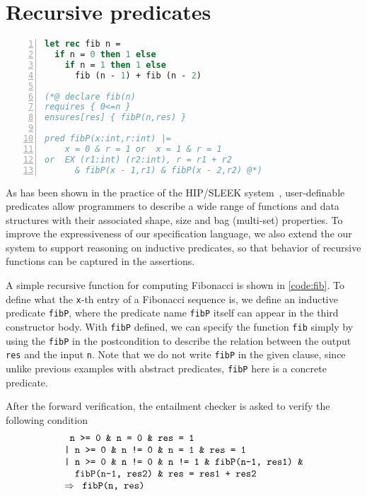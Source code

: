 \section{Recursive predicates}

\begin{lstlisting}[language=Caml, mathescape=true, xleftmargin=2em, aboveskip=1em, xrightmargin=1em, numbers=left, frame = {TB}, caption=Use recursive predicate to verify Fibonacci, label=code:fib ]
let rec fib n =
  if n = 0 then 1 else
    if n = 1 then 1 else 
      fib (n - 1) + fib (n - 2)
      
(*@ declare fib(n)
requires { 0<=n }
ensures[res] { fibP(n,res) }

pred fibP(x:int,r:int) |=
    x = 0 & r = 1 or  x = 1 & r = 1
or  EX (r1:int) (r2:int), r = r1 + r2 
      & fibP(x - 1,r1) & fibP(x - 2,r2) @*)
\end{lstlisting}

As has been shown in the practice of the HIP/SLEEK system~\cite{Chin2012HipSleek},
user-definable predicates allow programmers to describe a wide range of 
functions and data structures with their associated shape, size and 
bag (multi-set) properties.
To improve the expressiveness of our specification language, we also extend the our
system to support reasoning on inductive predicates, so that behavior of
recursive functions can be captured in the assertions.

A simple recursive function for computing Fibonacci is shown in \ref{code:fib}.
To define what the \texttt{x}-th entry of a Fibonacci sequence is,
we define an inductive predicate \texttt{fibP}, where 
the predicate name \texttt{fibP} itself can appear in the third constructor body.
With \texttt{fibP} defined, we can specify the function \texttt{fib} simply by
using the \texttt{fibP} in the postcondition to describe the relation
between the output \texttt{res} and the input \texttt{n}. Note that we do not
write \texttt{fibP} in the given clause, since unlike previous examples
with abstract predicates, \texttt{fibP} here is a concrete predicate.

After the forward verification, the entailment checker is asked to verify the following condition
$$
\begin{array}{l}
\texttt{ n >= 0 \& n = 0 \& res = 1} \\
\texttt{| n >= 0 \& n != 0 \& n = 1 \& res = 1} \\
\texttt{| n >= 0 \& n != 0 \& n != 1 \& fibP(n-1, res1) \&} \\
\texttt{\quad fibP(n-1, res2) \& res = res1 + res2} \\
\Rightarrow \texttt{\ fibP(n, res)}
\end{array}
$$

